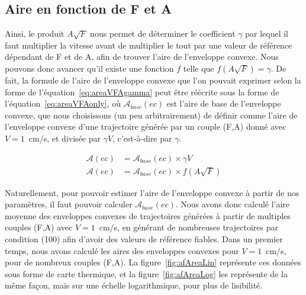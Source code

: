 	
	\subsection{Aire en fonction de F et A}
	Ainsi, le produit $A\sqrt{F}$ nous permet de déterminer le coefficient $\gamma$ par lequel il faut multiplier la vitesse avant de multiplier le tout par une valeur de référence dépendant de F et de A, afin de trouver l'aire de l'enveloppe convexe. Nous pouvons donc avancer qu'il existe une fonction $f$ telle que $f\left(A\sqrt{F}\right) = \gamma$. De fait, la formule de l'aire de l'enveloppe convexe que l'on pouvait exprimer selon la forme de l'équation~\ref{eq:areaVFAgamma} peut être réécrite sous la forme de l'équation~\ref{eq:areaVFAonly}, où $\mathcal{A}_{base}(ec)$ est l'aire \og de base \fg{} de l'enveloppe convexe, que nous choisissons (un peu arbitrairement) de définir comme l'aire de l'enveloppe convexe d'une trajectoire générée par un couple (F,A) donné avec $V = 1$~cm/s, et divisée par $\gamma{}V$, c'est-à-dire par $\gamma$.

	\begin{align}
		\label{eq:areaVFAgamma}
		\mathcal{A}(ec) &= \mathcal{A}_{base}(ec) \times \gamma{}V \\
		\label{eq:areaVFAonly}
		\mathcal{A}(ec) &= \mathcal{A}_{base}(ec) \times f\left(A\sqrt{F}\right)
	\end{align}
	
	Naturellement, pour pouvoir estimer l'aire de l'enveloppe convexe à partir de nos paramètres, il faut pouvoir calculer $\mathcal{A}_{base}(ec)$. Nous avons donc calculé l'aire moyenne des enveloppes convexes de trajectoires générées à partir de multiples couples (F,A) avec $V = 1$~cm/s, en générant de nombreuses trajectoires par condition (100) afin d'avoir des valeurs de référence fiables. Dans un premier temps, nous avons calculé les aires des enveloppes convexes pour $V = 1$~cm/s, pour de nombreux couples (F,A). La figure~\ref{fig:afAreaLin} représente ces données sous forme de carte thermique, et la figure~\ref{fig:afAreaLog} les représente de la même façon, mais sur une échelle logarithmique, pour plus de lisibilité.
	

